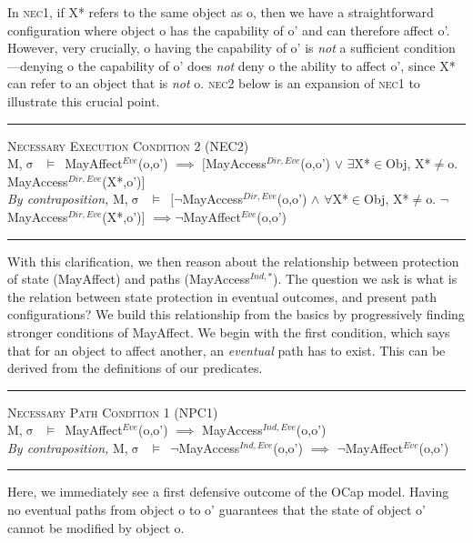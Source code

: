 \documentclass[a4paper,11pt, twoside,twocolumn]{article}
\newenvironment{logic}[1][]
{\begin{flushleft} \small }
{\end{flushleft}}
\newcommand{\loin}{$\in$}
\newcommand{\loforall}{$\forall$}
\newcommand{\loexists}{$\exists$}
\newcommand{\loand}{$\land$}
\newcommand{\loor} {$\lor$}
\newcommand{\loneq} {$\neq$}
\newcommand{\loimplies}{$\implies$}
\newcommand{\losigma}{$\upsigma$}
\newcommand{\loturns} {$\vDash$}
\newcommand{\loneg}{$\boldsymbol \neg$}
\newcommand{\ablock} {\null\qquad}
\begin{document}
In \textsc{nec1}, if X* refers to the same object as o, then we have a straightforward configuration where object o has the capability of o' and can therefore affect o'. However, very crucially, o having the capability of o' is \textit{not} a sufficient condition---denying o the capability of o' does \textit{not} deny o the ability to affect o', since X* can refer to an object that is \textit{not} o. \textsc{nec2} below is an expansion of \textsc{nec1} to illustrate this crucial point.
\begin{logic}
\hrule\null
\textsc{\normalsize *Necessary Execution Condition 2 (NEC2)}\\
M,\losigma\ \loturns\ MayAffect$^{Eve}$(o,o') \loimplies\linebreak
	\ablock $[$MayAccess$^{Dir,Eve}$(o,o') \loor\linebreak
	\ablock \loexists X*\loin{Obj}, X*\loneq o. MayAccess$^{Dir,Eve}$(X*,o')$]$
\linebreak\\
\textit{By contraposition,}\linebreak
M,\losigma\ \loturns\ $[$\loneg MayAccess$^{Dir,Eve}$(o,o') \loand\linebreak
	\ablock \loforall X*\loin{Obj}, X*\loneq o. \loneg MayAccess$^{Dir,Eve}$(X*,o')$]$ \linebreak
	\ablock \loimplies\loneg MayAffect$^{Eve}$(o,o')\linebreak
\hrule
\end{logic}
With this clarification, we then reason about the relationship between protection of state (MayAffect) and paths (MayAccess$^{Ind,*}$). The question we ask is what is the relation between state protection in eventual outcomes, and present path configurations? We build this relationship from the basics by progressively finding stronger conditions of MayAffect. We begin with the first condition, which says that for an object to affect another, an \textit{eventual} path has to exist. This can be derived from the definitions of our predicates.
\begin{logic}
\hrule\null
\textsc{\normalsize *Necessary Path Condition 1 (NPC1)}\\
M,\losigma\ \loturns\ MayAffect$^{Eve}$(o,o') \loimplies\linebreak
	\ablock MayAccess$^{Ind,Eve}$(o,o')
\linebreak \\
\textit{By contraposition,}\linebreak
M,\losigma\ \loturns\ \loneg MayAccess$^{Ind,Eve}$(o,o') \loimplies\linebreak
	\ablock \loneg MayAffect$^{Eve}$(o,o')
\linebreak
\hrule
\end{logic}
Here, we immediately see a first defensive outcome of the OCap model. Having no eventual paths from object o to o' guarantees that the state of object o' cannot be modified by object o.\\
\end{document}
